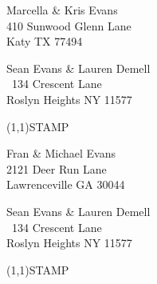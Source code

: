\documentclass[12pt]{article}
\begin{document}
\begin{center} \begin{Huge} \vspace*{\fill}
Marcella \& Kris Evans\\
410 Sunwood Glenn Lane\\
Katy TX 77494\\
\vspace{\fill} \end{Huge} \end{center}

\clearpage

\begin{minipage}{.5\linewidth} \noindent
Sean Evans \& Lauren Demell\\\ 
134 Crescent Lane\\ 
Roslyn Heights NY 11577
\end{minipage}
\begin{minipage}{.5\linewidth \hspace{-.2in} \vspace{-.3in}}
\begin{flushright}
\framebox(1,1){STAMP}
\end{flushright}
\end{minipage}

\begin{center} \begin{Huge} \vspace*{\fill}
Fran \& Michael Evans\\
2121 Deer Run Lane\\
Lawrenceville GA 30044\\
\vspace{\fill} \end{Huge} \end{center}

\clearpage

\begin{minipage}{.5\linewidth} \noindent
Sean Evans \& Lauren Demell\\\ 
134 Crescent Lane\\ 
Roslyn Heights NY 11577
\end{minipage}
\begin{minipage}{.5\linewidth \hspace{-.2in} \vspace{-.3in}}
\begin{flushright}
\framebox(1,1){STAMP}
\end{flushright}
\end{minipage}
\end{document}
